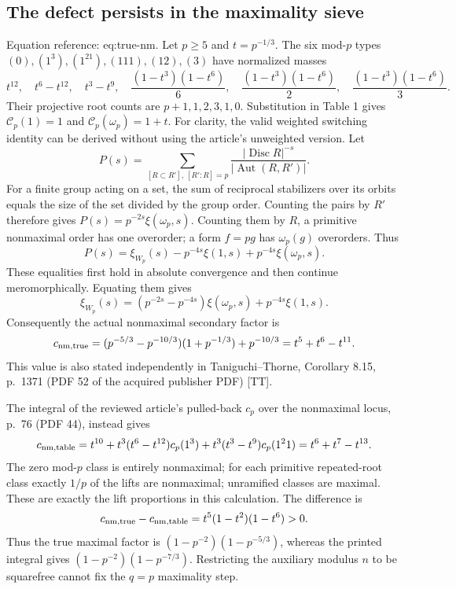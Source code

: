 \documentclass[10pt]{article}
\begin{document}
\subsection*{The defect persists in the maximality sieve}
Equation reference: eq:true-nm. Let \(p\ge5\) and \(t=p^{-1/3}\). The six mod-\(p\) types \((0),(1^3),(1^21),(111),(12),(3)\) have normalized masses \[t^{12},\quad t^6-t^{12},\quad t^3-t^9,\quad
 \frac{(1-t^3)(1-t^6)}6,\quad
 \frac{(1-t^3)(1-t^6)}2,\quad
 \frac{(1-t^3)(1-t^6)}3.\] Their projective root counts are \(p+1,1,2,3,1,0\). Substitution in Table 1 gives \(\mathcal C_p(1)=1\) and \(\mathcal C_p(\omega_p)=1+t\). For clarity, the valid weighted switching identity can be derived without using the article’s unweighted version. Let \[P(s)=\sum_{[R\subset R'],\, [R':R]=p}
       \frac{|\operatorname{Disc}R|^{-s}}{|\operatorname{Aut}(R,R')|}.\] For a finite group acting on a set, the sum of reciprocal stabilizers over its orbits equals the size of the set divided by the group order. Counting the pairs by \(R'\) therefore gives \(P(s)=p^{-2s}\xi(\omega_p,s)\). Counting them by \(R\), a primitive nonmaximal order has one overorder; a form \(f=pg\) has \(\omega_p(g)\) overorders. Thus \[P(s)=\xi_{W_p}(s)-p^{-4s}\xi(1,s)+p^{-4s}\xi(\omega_p,s).\] These equalities first hold in absolute convergence and then continue meromorphically. Equating them gives \[\xi_{W_p}(s)
 =(p^{-2s}-p^{-4s})\xi(\omega_p,s)+p^{-4s}\xi(1,s).\] Consequently the actual nonmaximal secondary factor is \[
 c_{\rm nm,true}
 =(p^{-5/3}-p^{-10/3})(1+p^{-1/3})+p^{-10/3}
 =t^5+t^6-t^{11}.\] This value is also stated independently in Taniguchi–Thorne, Corollary 8.15, p. 1371 (PDF 52 of the acquired publisher PDF) [TT].\par
The integral of the reviewed article’s pulled-back \(c_p\) over the nonmaximal locus, p. 76 (PDF 44), instead gives \[c_{\rm nm,table}
 =t^{10}+t^3(t^6-t^{12})c_p(1^3)
          +t^3(t^3-t^9)c_p(1^21)
 =t^6+t^7-t^{13}.\] The zero mod-\(p\) class is entirely nonmaximal; for each primitive repeated-root class exactly \(1/p\) of the lifts are nonmaximal; unramified classes are maximal. These are exactly the lift proportions in this calculation. The difference is \[c_{\rm nm,true}-c_{\rm nm,table}
   =t^5(1-t^2)(1-t^6)>0.\] Thus the true maximal factor is \((1-p^{-2})(1-p^{-5/3})\), whereas the printed integral gives \((1-p^{-2})(1-p^{-7/3})\). Restricting the auxiliary modulus \(n\) to be squarefree cannot fix the \(q=p\) maximality step.\par
\end{document}
